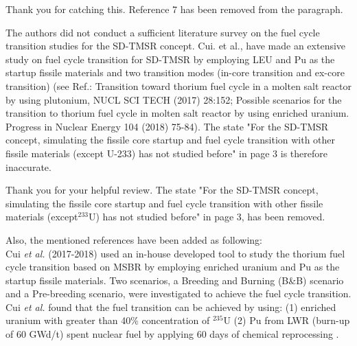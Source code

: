 \documentclass[answers,11pt]{exam}
\begin{document}
\begin{questions}
\begin{solution}
                 Thank you for catching this. Reference 7 has been removed from the paragraph.
                 
        \end{solution}


        \question The authors did not conduct a sufficient literature survey on the fuel cycle transition studies for the SD-TMSR concept. Cui. et al., have made an extensive study on fuel cycle transition for SD-TMSR by employing LEU and Pu as the startup fissile materials and two transition modes (in-core transition and ex-core transition) (see Ref.: Transition toward thorium fuel cycle in a molten salt reactor by using plutonium, NUCL SCI TECH (2017) 28:152; Possible scenarios for the transition to thorium fuel cycle in molten salt reactor by using enriched uranium. Progress in Nuclear Energy 104 (2018) 75-84). The state "For the SD-TMSR concept, simulating the fissile core startup and fuel cycle transition with other fissile materials (except U-233) has not studied before" in page 3 is therefore inaccurate.
        \begin{solution}
                Thank you for your helpful review. The state "For the SD-TMSR concept, simulating the fissile core startup and fuel cycle transition with other fissile materials (except$^{233}$U) has not studied before" in page 3, has been removed. 
                
                Also, the mentioned references have been added as following:\\
                Cui \emph{et al.} (2017-2018) used an in-house developed tool to study the thorium fuel cycle transition based on MSBR by employing enriched uranium and Pu as the startup fissile materials. Two scenarios, a Breeding and Burning (B\&B) scenario and a Pre-breeding scenario, were investigated to achieve the fuel cycle transition. Cui \emph{et al.} found that the fuel transition can be achieved by using: (1) enriched uranium with greater than 40\% concentration of $^{235}$U (2) Pu from LWR (burn-up of 60 GWd/t) spent nuclear fuel by applying 60 days of chemical reprocessing \cite{cui2017transition,cui2018possible}.
                
        \end{solution}

        


\end{questions}
\end{document}

